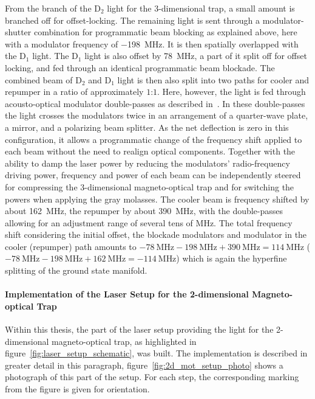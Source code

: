 From the branch of the D$_2$ light for the 3-dimensional trap, a small amount is branched off for offset-locking. The remaining light is sent through a modulator-shutter combination for programmatic beam blocking as explained above, here with a modulator frequency of \SI{-198}{\mega\hertz}. It is then spatially overlapped with the D$_1$ light. The D$_1$ light is also offset by \SI{+78}{\mega\hertz}, a part of it split off for offset locking, and fed through an identical programmatic beam blockade. The combined beam of D$_2$ and D$_1$ light is then also split into two paths for cooler and repumper in a ratio of approximately $1$:$1$. Here, however, the light is fed through acousto-optical modulator double-passes as described in~\cite{qesja_design_2022}. In these double-passes the light crosses the modulators twice in an arrangement of a quarter-wave plate, a mirror, and a polarizing beam splitter. As the net deflection is zero in this configuration, it allows a programmatic change of the frequency shift applied to each beam without the need to realign optical components. Together with the ability to damp the laser power by reducing the modulators' radio-frequency driving power, frequency and power of each beam can be independently steered for compressing the 3-dimensional magneto-optical trap and for switching the powers when applying the gray molasses. The cooler beam is frequency shifted by about \SI{+162}{\mega\hertz}, the repumper by about \SI{+390}{\mega\hertz}, with the double-passes allowing for an adjustment range of several tens of \si{\mega\hertz}. The total frequency shift considering the initial offset, the blockade modulators and modulator in the cooler (repumper) path amounts to $\SI{-78}{\mega\hertz} - \SI{198}{\mega\hertz} + \SI{390}{\mega\hertz} = \SI{+114}{\mega\hertz}$ ($\SI{-78}{\mega\hertz} - \SI{198}{\mega\hertz} + \SI{162}{\mega\hertz} = \SI{-114}{\mega\hertz}$) which is again the hyperfine splitting of the ground state manifold.

\paragraph{Implementation of the Laser Setup for the 2-dimensional Magneto-optical Trap}
Within this thesis, the part of the laser setup providing the light for the 2-dimensional magneto-optical trap, as highlighted in figure~\ref{fig:laser_setup_schematic}, was built. The implementation is described in greater detail in this paragraph, figure~\ref{fig:2d_mot_setup_photo} shows a photograph of this part of the setup. For each step, the corresponding marking from the figure is given for orientation.

